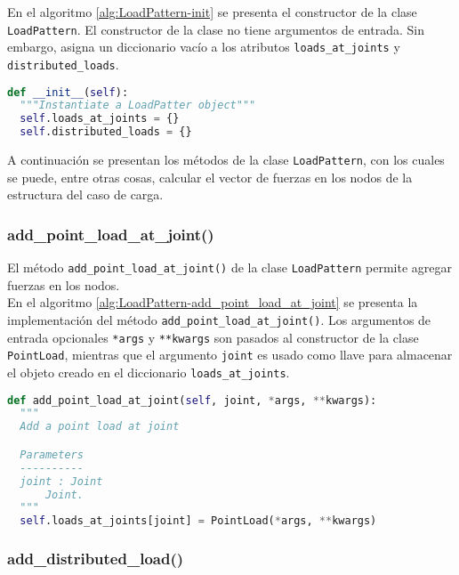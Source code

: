 En el algoritmo \ref{alg:LoadPattern-init} se presenta el constructor de la clase \verb|LoadPattern|. El constructor de la clase no tiene argumentos de entrada. Sin embargo, asigna un diccionario vacío a los atributos \verb|loads_at_joints| y \verb|distributed_loads|.\\

\begin{lstlisting}[language=Python,caption=Constructor de la clase \texttt{LoadPattern}.,label=alg:LoadPattern-init, frame=single]
def __init__(self):
  """Instantiate a LoadPatter object"""
  self.loads_at_joints = {}
  self.distributed_loads = {}
\end{lstlisting}
\bigskip
A continuación se presentan los métodos de la clase \verb|LoadPattern|, con los cuales se puede, entre otras cosas, calcular el vector de fuerzas en los nodos de la estructura del caso de carga.\\

\subsubsection{add\_point\_load\_at\_joint()}

El método \verb|add_point_load_at_joint()| de la clase \verb|LoadPattern| permite agregar fuerzas en los nodos.\\

En el algoritmo \ref{alg:LoadPattern-add_point_load_at_joint} se presenta la implementación del método \verb|add_point_load_at_joint()|. Los argumentos de entrada opcionales \verb|*args| y \verb|**kwargs| son pasados al constructor de la clase \verb|PointLoad|, mientras que el argumento \verb|joint| es usado como llave para almacenar el objeto creado en el diccionario \verb|loads_at_joints|.\\

\begin{lstlisting}[language=Python,caption=Método \texttt{add\_point\_load\_at\_joint()} de la clase \texttt{LoadPattern}.,label=alg:LoadPattern-add_point_load_at_joint, frame=single]
def add_point_load_at_joint(self, joint, *args, **kwargs):
  """
  Add a point load at joint

  Parameters
  ----------
  joint : Joint
      Joint.
  """
  self.loads_at_joints[joint] = PointLoad(*args, **kwargs)
\end{lstlisting}

\subsubsection{add\_distributed\_load()}

